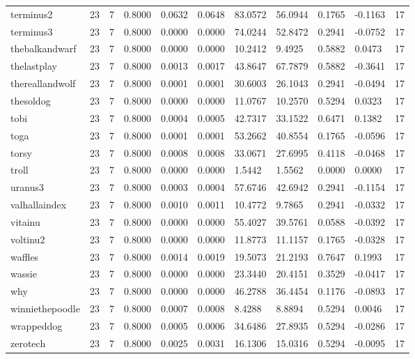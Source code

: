 \begin{table}[htbp]
\begin{tabular}{lllllllllll}
terminus2 & 23 & 7 & 0.8000 & 0.0632 & 0.0648 & 83.0572 & 56.0944 & 0.1765 & -0.1163 & 17 \\
terminus3 & 23 & 7 & 0.8000 & 0.0000 & 0.0000 & 74.0244 & 52.8472 & 0.2941 & -0.0752 & 17 \\
thebalkandwarf & 23 & 7 & 0.8000 & 0.0000 & 0.0000 & 10.2412 & 9.4925 & 0.5882 & 0.0473 & 17 \\
thelastplay & 23 & 7 & 0.8000 & 0.0013 & 0.0017 & 43.8647 & 67.7879 & 0.5882 & -0.3641 & 17 \\
thereallandwolf & 23 & 7 & 0.8000 & 0.0001 & 0.0001 & 30.6003 & 26.1043 & 0.2941 & -0.0494 & 17 \\
thesoldog & 23 & 7 & 0.8000 & 0.0000 & 0.0000 & 11.0767 & 10.2570 & 0.5294 & 0.0323 & 17 \\
tobi & 23 & 7 & 0.8000 & 0.0004 & 0.0005 & 42.7317 & 33.1522 & 0.6471 & 0.1382 & 17 \\
toga & 23 & 7 & 0.8000 & 0.0001 & 0.0001 & 53.2662 & 40.8554 & 0.1765 & -0.0596 & 17 \\
torsy & 23 & 7 & 0.8000 & 0.0008 & 0.0008 & 33.0671 & 27.6995 & 0.4118 & -0.0468 & 17 \\
troll & 23 & 7 & 0.8000 & 0.0000 & 0.0000 & 1.5442 & 1.5562 & 0.0000 & 0.0000 & 17 \\
uranus3 & 23 & 7 & 0.8000 & 0.0003 & 0.0004 & 57.6746 & 42.6942 & 0.2941 & -0.1154 & 17 \\
valhallaindex & 23 & 7 & 0.8000 & 0.0010 & 0.0011 & 10.4772 & 9.7865 & 0.2941 & -0.0332 & 17 \\
vitainu & 23 & 7 & 0.8000 & 0.0000 & 0.0000 & 55.4027 & 39.5761 & 0.0588 & -0.0392 & 17 \\
voltinu2 & 23 & 7 & 0.8000 & 0.0000 & 0.0000 & 11.8773 & 11.1157 & 0.1765 & -0.0328 & 17 \\
waffles & 23 & 7 & 0.8000 & 0.0014 & 0.0019 & 19.5073 & 21.2193 & 0.7647 & 0.1993 & 17 \\
wassie & 23 & 7 & 0.8000 & 0.0000 & 0.0000 & 23.3440 & 20.4151 & 0.3529 & -0.0417 & 17 \\
why & 23 & 7 & 0.8000 & 0.0000 & 0.0000 & 46.2788 & 36.4454 & 0.1176 & -0.0893 & 17 \\
winniethepoodle & 23 & 7 & 0.8000 & 0.0007 & 0.0008 & 8.4288 & 8.8894 & 0.5294 & 0.0046 & 17 \\
wrappeddog & 23 & 7 & 0.8000 & 0.0005 & 0.0006 & 34.6486 & 27.8935 & 0.5294 & -0.0286 & 17 \\
zerotech & 23 & 7 & 0.8000 & 0.0025 & 0.0031 & 16.1306 & 15.0316 & 0.5294 & -0.0095 & 17 \\

\end{tabular}
\end{table}
